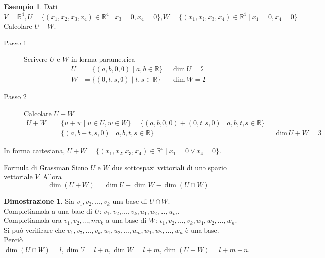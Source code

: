 \documentclass[a4paper]{article}
\theoremstyle{definition}
\newtheorem*{dimm}{Dimostrazione}
\newtheorem*{es}{Esempio}
\begin{document}
\begin{es}
	Dati $V = \mathbb{R}^4, U = \{ (x_1, x_2, x_3, x_4) \in \mathbb{R}^4 \mid x_3 = 0, x_4 = 0 \}, W = \{ (x_1, x_2, x_3, x_4) \in \mathbb{R}^4 \mid x_1 = 0, x_4 = 0 \}$ \\
	Calcolare $U + W$.
	\begin{description}
		\item[Passo 1] Scrivere $U$ e $W$ in forma parametrica
		      \begin{align*}
			      U & = \{(a, b, 0, 0) \mid a, b \in \mathbb{R}\} &  & \text{dim} \ U = 2 \\
			      W & = \{(0, t, s, 0) \mid t, s \in \mathbb{R}\} &  & \text{dim} \ W = 2
		      \end{align*}
		\item[Passo 2] Calcolare $U + W$
		      \begin{align*}
			      U + W & = \{u + w \mid u \in U, w \in W\} = \{(a, b, 0, 0) + (0, t, s, 0) \mid a, b, t, s \in \mathbb{R}\}                             \\
			            & = \{(a, b + t, s, 0) \mid a, b, t, s \in \mathbb{R}\}                                              &  & \text{dim} \ U + W = 3
		      \end{align*}
	\end{description}
	In forma cartesiana, $U + W = \{(x_1, x_2, x_3, x_4) \in \mathbb{R}^4 \mid x_1 = 0 \lor x_4 = 0\}$.
\end{es}

\begin{teo}{Formula di Grassman}{}
	Siano $U$ e $W$ due sottospazi vettoriali di uno spazio vettoriale $V$. Allora
	\begin{equation*}
		\dim(U + W) = \dim U + \dim W - \dim(U \cap W)
	\end{equation*}
\end{teo}
\begin{dimm}
	Sia $v_1, v_2, ..., v_k$ una base di $U \cap W$. \\
	Completiamola a una base di $U$: $v_1, v_2, ..., v_k, u_1, u_2, ..., u_m$. \\
	Completiamola ora $v_1, v_2, ...,m v_k$ a una base di $W$: $v_1, v_2, ..., v_k, w_1, w_2, ..., w_n$. \\
	Si può verificare che $v_1, v_2, ..., v_k, u_1, u_2, ..., u_m, w_1, w_2, ..., w_n$ è una base. \\
	Perciò $\dim(U \cap W) = l, \dim U = l + n, \dim W = l + m, \dim(U + W) = l + m + n$.
\end{dimm}
\end{document}
